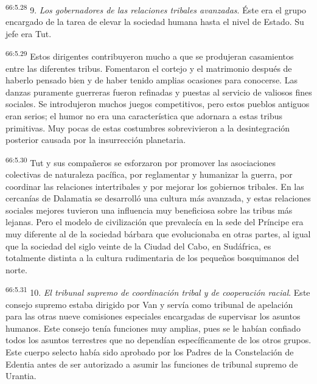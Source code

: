 \par
\textsuperscript{66:5.28} 9. \textit{Los gobernadores de las relaciones tribales avanzadas}. Éste era el grupo encargado de la tarea de elevar la sociedad humana hasta el nivel de Estado. Su jefe era Tut.

\par
\textsuperscript{66:5.29} Estos dirigentes contribuyeron mucho a que se produjeran casamientos entre las diferentes tribus. Fomentaron el cortejo y el matrimonio después de haberlo pensado bien y de haber tenido amplias ocasiones para conocerse. Las danzas puramente guerreras fueron refinadas y puestas al servicio de valiosos fines sociales. Se introdujeron muchos juegos competitivos, pero estos pueblos antiguos eran serios; el humor no era una característica que adornara a estas tribus primitivas. Muy pocas de estas costumbres sobrevivieron a la desintegración posterior causada por la insurrección planetaria.

\par
\textsuperscript{66:5.30} Tut y sus compañeros se esforzaron por promover las asociaciones colectivas de naturaleza pacífica, por reglamentar y humanizar la guerra, por coordinar las relaciones intertribales y por mejorar los gobiernos tribales. En las cercanías de Dalamatia se desarrolló una cultura más avanzada, y estas relaciones sociales mejores tuvieron una influencia muy beneficiosa sobre las tribus más lejanas. Pero el modelo de civilización que prevalecía en la sede del Príncipe era muy diferente al de la sociedad bárbara que evolucionaba en otras partes, al igual que la sociedad del siglo veinte de la Ciudad del Cabo, en Sudáfrica, es totalmente distinta a la cultura rudimentaria de los pequeños bosquimanos del norte.

\par
\textsuperscript{66:5.31} 10. \textit{El tribunal supremo de coordinación tribal y de cooperación racial}. Este consejo supremo estaba dirigido por Van y servía como tribunal de apelación para las otras nueve comisiones especiales encargadas de supervisar los asuntos humanos. Este consejo tenía funciones muy amplias, pues se le habían confiado todos los asuntos terrestres que no dependían específicamente de los otros grupos. Este cuerpo selecto había sido aprobado por los Padres de la Constelación de Edentia antes de ser autorizado a asumir las funciones de tribunal supremo de Urantia.

